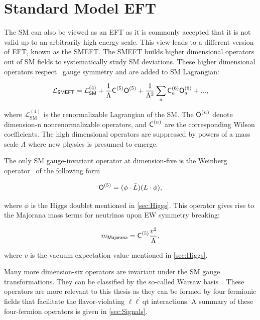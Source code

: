 \section{Standard Model EFT}
\label{sec:SMEFT}

The \ac{SM} can also be viewed as an \ac{EFT} as it is commonly accepted that it is not valid up to an arbitrarily high energy scale. This view leads to a different version of \ac{EFT}, known as the \ac{SMEFT}. The \ac{SMEFT} builds higher dimensional operators out of \ac{SM} fields to systematically study \ac{SM} deviations. These higher dimensional operators respect \sm~gauge symmetry and are added to \ac{SM} Lagrangian:

\begin{equation}
\label{eq:SMEFT}
\mathcal{L}_{\textsf{SMEFT}}=\mathcal{L}_{\textsf{SM}}^{(4)} + \frac{1}{\mathrm{\Lambda}}\textsf{C}^{(5)}_{}\textsf{O}^{(5)}_{}+ \frac{1}{\mathrm{\Lambda}^2}\sum_{a}\textsf{C}^{(6)}_{a}\textsf{O}^{(6)}_{a} + ...,
\end{equation}  

where $\mathcal{L}_{\text{SM}}^{(4)}$ is the renormalizable Lagrangian of the \ac{SM}. The $\textsf{O}^{(n)}_{}$ denote dimension-n nonrenormalizable operators, and $\textsf{C}^{(n)}_{}$ are the corresponding Wilson coefficients. The high dimensional operators are suppressed by powers of a mass scale $\Lambda$ where new physics is presumed to emerge. 

The only \ac{SM} gauge-invariant operator at dimension-five is the Weinberg operator~\cite{Weinberg:1979sa} of the following form

\begin{equation}
\textsf{O}^{(5)}_{}=(\phi\cdot\bar{L})(L\cdot\phi),
\end{equation}

where $\phi$ is the Higgs doublet mentioned in \autoref{sec:Higgs}. This operator gives rise to the Majorana mass terms for neutrinos upon \ac{EW} symmetry breaking:

\begin{equation}
m_{\textsf{Majorana}}=\textsf{C}^{(5)}_{}\frac{v^2}{\mathrm{\Lambda}},
\end{equation}

where $v$ is the vacuum expectation value mentioned in \autoref{sec:Higgs}.

Many more dimension-six operators are invariant under the \ac{SM} gauge transformations. They can be classified by the so-called Warsaw basis~\cite{Grzadkowski:2010es}. These operators are more relevant to this thesis as they can be formed by four fermionic fields that facilitate the flavor-violating $\ell\ell^{\prime}$qt interactions. A summary of these four-fermion operators is given in \autoref{sec:Signals}.